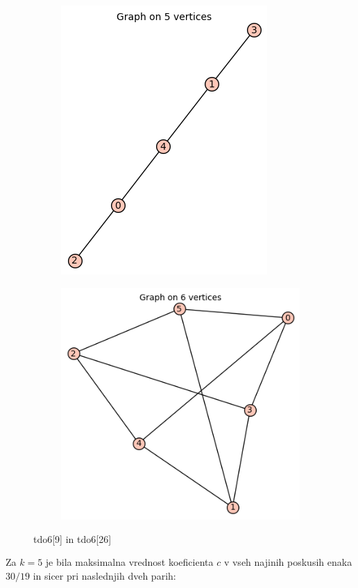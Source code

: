 \documentclass[12pt, a4paper]{article}
\begin{document}
\begin{center}
\begin{figure}[!htb]
\centering
\begin{subfigure}{0.5\textwidth}
  \centering
  \includegraphics[width=0.34\linewidth]{tdo6[9]}
\end{subfigure}%
\begin{subfigure}{0.5\textwidth}
  \centering
  \includegraphics[width=0.45\linewidth]{tdo6[26]}
\end{subfigure}
\caption{tdo6[9] in tdo6[26]}
\label{fig:test}
\end{figure}
\end{center}
Za $k=5$  je bila maksimalna vrednost koeficienta $c$ v vseh najinih poskusih enaka $30/19$ in sicer pri naslednjih dveh parih: 
\end{document}
